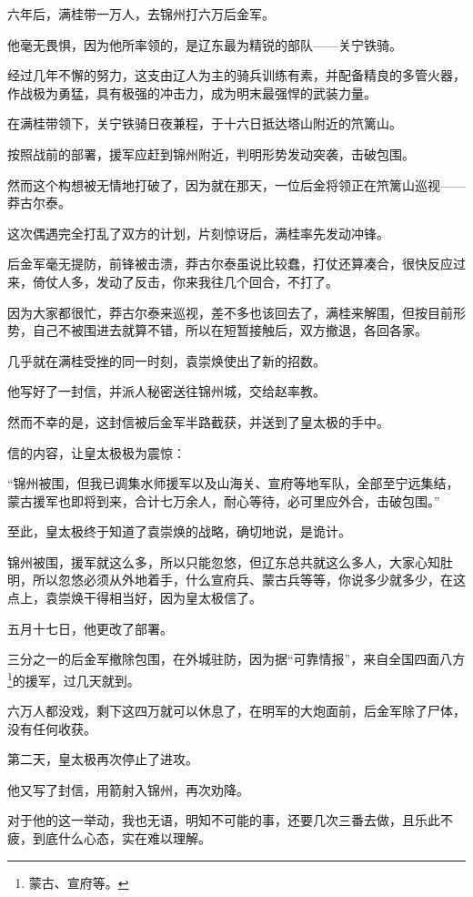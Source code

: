 \begin{multicols}{\theparacolNo}
六年后，满桂带一万人，去锦州打六万后金军。

他毫无畏惧，因为他所率领的，是辽东最为精锐的部队——关宁铁骑。

经过几年不懈的努力，这支由辽人为主的骑兵训练有素，并配备精良的多管火器，作战极为勇猛，具有极强的冲击力，成为明末最强悍的武装力量。

在满桂带领下，关宁铁骑日夜兼程，于十六日抵达塔山附近的笊篱山。

按照战前的部署，援军应赶到锦州附近，判明形势发动突袭，击破包围。

然而这个构想被无情地打破了，因为就在那天，一位后金将领正在笊篱山巡视——莽古尔泰。

这次偶遇完全打乱了双方的计划，片刻惊讶后，满桂率先发动冲锋。

后金军毫无提防，前锋被击溃，莽古尔泰虽说比较蠢，打仗还算凑合，很快反应过来，倚仗人多，发动了反击，你来我往几个回合，不打了。

因为大家都很忙，莽古尔泰来巡视，差不多也该回去了，满桂来解围，但按目前形势，自己不被围进去就算不错，所以在短暂接触后，双方撤退，各回各家。

几乎就在满桂受挫的同一时刻，袁崇焕使出了新的招数。

他写好了一封信，并派人秘密送往锦州城，交给赵率教。

然而不幸的是，这封信被后金军半路截获，并送到了皇太极的手中。

信的内容，让皇太极极为震惊：

“锦州被围，但我已调集水师援军以及山海关、宣府等地军队，全部至宁远集结，蒙古援军也即将到来，合计七万余人，耐心等待，必可里应外合，击破包围。”

至此，皇太极终于知道了袁崇焕的战略，确切地说，是诡计。

锦州被围，援军就这么多，所以只能忽悠，但辽东总共就这么多人，大家心知肚明，所以忽悠必须从外地着手，什么宣府兵、蒙古兵等等，你说多少就多少，在这点上，袁崇焕干得相当好，因为皇太极信了。

五月十七日，他更改了部署。

三分之一的后金军撤除包围，在外城驻防，因为据“可靠情报”，来自全国四面八方\footnote{蒙古、宣府等。}的援军，过几天就到。

六万人都没戏，剩下这四万就可以休息了，在明军的大炮面前，后金军除了尸体，没有任何收获。

第二天，皇太极再次停止了进攻。

他又写了封信，用箭射入锦州，再次劝降。

对于他的这一举动，我也无语，明知不可能的事，还要几次三番去做，且乐此不疲，到底什么心态，实在难以理解。


\end{multicols}
